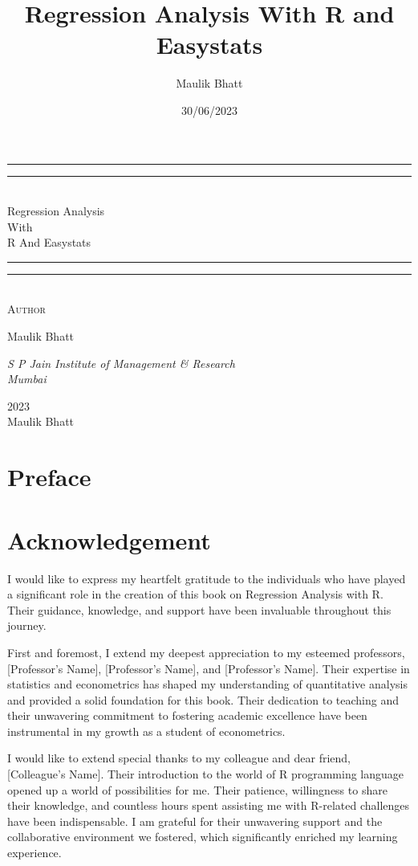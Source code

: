 \documentclass[
  letterpaper,
  paper =a4,
  twoside,
  openright,
  headsepline,
  footsepline,
  listof = totocnumbered,
  chapterprefix = true,
  firstiscover]{scrbook}
\title{Regression Analysis With R and Easystats}
\author{Maulik Bhatt}
\date{30/06/2023}
\renewcommand{\maketitle}{
\begin{titlepage}
	\centering
	\vspace*{\baselineskip}
	\rule{\textwidth}{1.6pt}\vspace*{-\baselineskip}\vspace*{2pt}
	\rule{\textwidth}{0.4pt}\\[\baselineskip]
	{\LARGE Regression Analysis\\ With \\[0.3\baselineskip] R And Easystats}\\[0.2\baselineskip]
	\rule{\textwidth}{0.4pt}\vspace*{-\baselineskip}\vspace{3.2pt}
	\rule{\textwidth}{1.6pt}\\[\baselineskip]
	\scshape
	\vspace*{8\baselineskip}
	Author \\[\baselineskip]
	{\Large Maulik Bhatt \par}
	{\itshape S P Jain Institute of Management \& Research \\ Mumbai\par}
	\vfill
	{\scshape 2023} \\
	{\large Maulik Bhatt}\par%
\end{titlepage}
}
\renewcommand*\contentsname{Table of contents}
\newcommand\contentsname{Table of contents}
\begin{document}
\frontmatter
\maketitle
\ifdefined\Shaded\renewenvironment{Shaded}{\begin{tcolorbox}[boxrule=0pt, enhanced, breakable, borderline west={3pt}{0pt}{shadecolor}, interior hidden, sharp corners, frame hidden]}{\end{tcolorbox}}\fi

\renewcommand*\contentsname{Contents}
{
\hypersetup{linkcolor=}
\setcounter{tocdepth}{2}
\tableofcontents
}
\listoffigures
\listoftables
\mainmatter
{}

\hypertarget{preface}{%
\chapter*{Preface}\label{preface}}



\hypertarget{acknowledgement}{%
\chapter*{Acknowledgement}\label{acknowledgement}}


I would like to express my heartfelt gratitude to the individuals who
have played a significant role in the creation of this book on
Regression Analysis with R. Their guidance, knowledge, and support have
been invaluable throughout this journey.

First and foremost, I extend my deepest appreciation to my esteemed
professors, {[}Professor's Name{]}, {[}Professor's Name{]}, and
{[}Professor's Name{]}. Their expertise in statistics and econometrics
has shaped my understanding of quantitative analysis and provided a
solid foundation for this book. Their dedication to teaching and their
unwavering commitment to fostering academic excellence have been
instrumental in my growth as a student of econometrics.

I would like to extend special thanks to my colleague and dear friend,
{[}Colleague's Name{]}. Their introduction to the world of R programming
language opened up a world of possibilities for me. Their patience,
willingness to share their knowledge, and countless hours spent
assisting me with R-related challenges have been indispensable. I am
grateful for their unwavering support and the collaborative environment
we fostered, which significantly enriched my learning experience.
\end{document}

